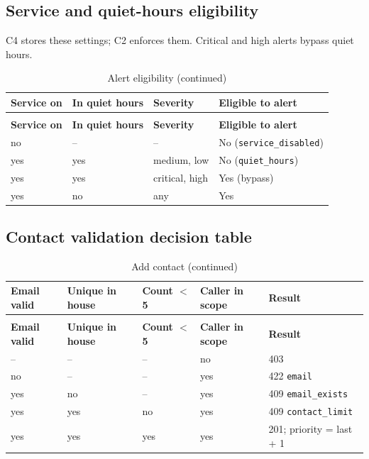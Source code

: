 \subsection{Service and quiet-hours eligibility}
C4 stores these settings; C2 enforces them. Critical and high alerts bypass quiet hours.
\begin{longtable}{L{2.6cm}L{2.8cm}L{3.0cm}L{6.0cm}}
\caption{Alert eligibility}\label{tab:c4-dt-quiet}\\
\toprule
\textbf{Service on} & \textbf{In quiet hours} & \textbf{Severity} & \textbf{Eligible to alert} \\
\midrule
\endfirsthead
\caption[]{Alert eligibility (continued)}\\
\toprule
\textbf{Service on} & \textbf{In quiet hours} & \textbf{Severity} & \textbf{Eligible to alert} \\
\midrule
\endhead
no & -- & -- & No (\texttt{service\_disabled}) \\
yes & yes & medium, low & No (\texttt{quiet\_hours}) \\
yes & yes & critical, high & Yes (bypass) \\
yes & no & any & Yes \\
\bottomrule
\end{longtable}

\subsection{Contact validation decision table}
\begin{longtable}{L{2.4cm}L{2.4cm}L{2.6cm}L{2.6cm}L{4.4cm}}
\caption{Add contact}\label{tab:c4-dt-contacts}\\
\toprule
\textbf{Email valid} & \textbf{Unique in house} & \textbf{Count $<$ 5} & \textbf{Caller in scope} & \textbf{Result} \\
\midrule
\endfirsthead
\caption[]{Add contact (continued)}\\
\toprule
\textbf{Email valid} & \textbf{Unique in house} & \textbf{Count $<$ 5} & \textbf{Caller in scope} & \textbf{Result} \\
\midrule
\endhead
-- & -- & -- & no & 403 \\
no & -- & -- & yes & 422 \texttt{email} \\
yes & no & -- & yes & 409 \texttt{email\_exists} \\
yes & yes & no & yes & 409 \texttt{contact\_limit} \\
yes & yes & yes & yes & 201; priority = last + 1 \\
\bottomrule
\end{longtable}

